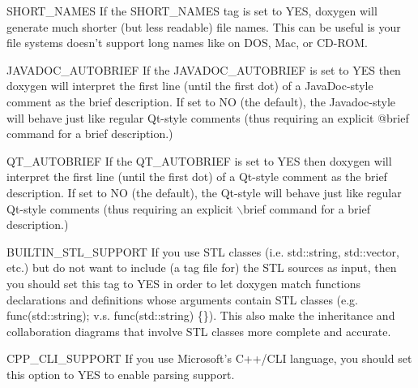 \begin{DoxyDescription}
\item[{\ttfamily SHORT\_\-NAMES} ] If the {\ttfamily SHORT\_\-NAMES} tag is set to {\ttfamily YES}, doxygen will generate much shorter (but less readable) file names. This can be useful is your file systems doesn't support long names like on DOS, Mac, or CD-\/ROM.

\label{config_cfg_javadoc_autobrief}
\hypertarget{config_cfg_javadoc_autobrief}{}
 
\item[{\ttfamily JAVADOC\_\-AUTOBRIEF} ] If the {\ttfamily JAVADOC\_\-AUTOBRIEF} is set to {\ttfamily YES} then doxygen will interpret the first line (until the first dot) of a JavaDoc-\/style comment as the brief description. If set to NO (the default), the Javadoc-\/style will behave just like regular Qt-\/style comments (thus requiring an explicit @brief command for a brief description.)

\label{config_cfg_qt_autobrief}
\hypertarget{config_cfg_qt_autobrief}{}
 
\item[{\ttfamily QT\_\-AUTOBRIEF} ] If the {\ttfamily QT\_\-AUTOBRIEF} is set to {\ttfamily YES} then doxygen will interpret the first line (until the first dot) of a Qt-\/style comment as the brief description. If set to NO (the default), the Qt-\/style will behave just like regular Qt-\/style comments (thus requiring an explicit $\backslash$brief command for a brief description.)

\label{config_cfg_builtin_stl_support}
\hypertarget{config_cfg_builtin_stl_support}{}
 
\item[{\ttfamily BUILTIN\_\-STL\_\-SUPPORT} ] If you use STL classes (i.e. std::string, std::vector, etc.) but do not want to include (a tag file for) the STL sources as input, then you should set this tag to {\ttfamily YES} in order to let doxygen match functions declarations and definitions whose arguments contain STL classes (e.g. func(std::string); v.s. func(std::string) \{\}). This also make the inheritance and collaboration diagrams that involve STL classes more complete and accurate.

\label{config_cfg_cpp_cli_support}
\hypertarget{config_cfg_cpp_cli_support}{}
 
\item[{\ttfamily CPP\_\-CLI\_\-SUPPORT} ] If you use Microsoft's C++/CLI language, you should set this option to YES to enable parsing support.


\end{DoxyDescription}
